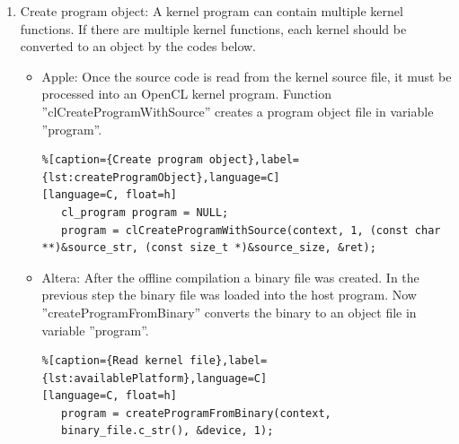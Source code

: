 \documentclass[12pt,a4paper,english,twoside,openright]{tutthesis}
\begin{document}
\begin{enumerate}
\begin{itemize}
\begin{lstlisting}
   /* Load kernel code */
   fp = fopen(fileName, "r");
   if (!fp) {
      fprintf(stderr, "Failed to load kernel.\n");
      exit(1);
   }
   source_str = (char*)malloc(MAX_SOURCE_SIZE);
   source_size = fread(source_str, 1, MAX_SOURCE_SIZE, fp);
   fclose(fp);
\end{lstlisting}
			\item Altera: Because the SoC is primitive Altera desires to offline compile the object file with a specific license. To load the binary file, parameter KERNEL\_NAME should contain the path to the binary file in the SoC directory. A last parameter defines the device where the kernel is installed.
\begin{lstlisting}%[caption={Read kernel file},label={lst:availablePlatform},language=C]
[language=C, float=h]
   std::string binary_file = getBoardBinaryFile(KERNEL_NAME,
   device);
\end{lstlisting}
		\end{itemize}
		
	\item Create program object:	A kernel program can contain multiple kernel functions. If there are multiple kernel functions, each kernel should be converted to an object by the codes below.
		\begin{itemize}
			\item Apple: Once the source code is read from the kernel source file, it must be processed into an OpenCL kernel program. Function ''clCreateProgramWithSource'' creates a program object file in variable ''program''.
\begin{lstlisting}%[caption={Create program object},label={lst:createProgramObject},language=C]
[language=C, float=h]
   cl_program program = NULL;
   program = clCreateProgramWithSource(context, 1, (const char **)&source_str, (const size_t *)&source_size, &ret);
\end{lstlisting}
			\item Altera: After the offline compilation a binary file was created. In the previous step the binary file was loaded into the host program. Now ''createProgramFromBinary'' converts the binary to an object file in variable ''program''. 
\begin{lstlisting}%[caption={Read kernel file},label={lst:availablePlatform},language=C]
[language=C, float=h]
   program = createProgramFromBinary(context,
   binary_file.c_str(), &device, 1);
\end{lstlisting}
		\end{itemize}
	

\end{enumerate}
\end{document}

